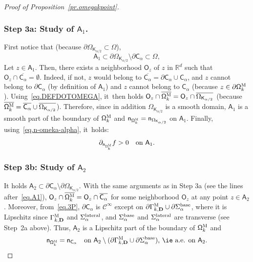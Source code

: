 \documentclass[JEP,XML,SOM,Unicode,NoEqCountersInSection,NoFloatCountersInSection,published]{cedram}
\newcommand{\mbf}[1]{\mathbf{#1}}
\let\pa\partial
\theoremstyle{plain}
\theoremstyle{definition}
\begin{document}
\begin{proof}[Proof of Proposition~\ref{pr.omegakpoint}]
\subsubsection*{Step 3a: Study of $\mathsf A_1$. }
First notice that (because $\partial \Omega_{\mathsf K_{\alpha/2}}\subset \Omega$),
\begin{equation}\label{eq.A1}
\mathsf A_1\subset \partial \Omega_{\mathsf K_{\alpha/2}}\setminus \pa \mathsf C_\alpha \subset \Omega,
\end{equation}
Let $z\in\mathsf A_1$. Then, there exists a neighborhood $\mathsf O_z$ of $z$ in $\mathbb R^d$ such that $\mathsf O_z\cap \overline{\mathsf C_\alpha}=\emptyset$. Indeed, if not, $z$ would belong to $\overline{\mathsf C_\alpha}=\pa \mathsf C_{\alpha}\cup \mathsf C_{\alpha}$, and $z$ cannot belong to $\pa \mathsf C_{\alpha}$ (by definition of $\mathsf A_1$) and $z$ cannot belong to $ \mathsf C_{\alpha}$ (because $z\in \pa \mathsf \Omega_k^{\textsc{M}}$). Using~\eqref{eq.DEFDOTOMEGA}, it~then holds $\mathsf O_z\cap \overline{\mathsf \Omega_k^{\textsc{M}}}= \mathsf O_z \cap \overline{\Omega_{\mathsf K_{\alpha/2}}}$ (because $\overline{\mathsf \Omega_k^{\textsc{M}}}=\overline{\mathsf C_\alpha}\cup \overline{\Omega_{\mathsf K_{\alpha/2}}}$).
Therefore, since in addition $\Omega_{\mathsf K_{\alpha/2}}$ is a smooth domain, $\mathsf A_1$ is a smooth part of the boundary of $ \mathsf \Omega_k^{\textsc{M}}$ and $\mathsf n_{ \mathsf \Omega_k^{\textsc{M}}}=\mathsf n_{ \Omega_{\mathsf K_{\alpha/2}}}$ on $\mathsf A_1$.
Finally, using~\eqref{eq.n-omeka-alpha}, it~holds:
\begin{equation}\label{eq.panf1}
\partial_{ \mathsf n_{ \mathsf \Omega_k^{\textsc{M}}}} f>0 \quad\text{on }\mathsf A_1.
\end{equation}
\subsubsection*{Step 3b: Study of $\mathsf A_2$}
It holds $\mathsf A_2 \subset \pa \mathsf C_\alpha\setminus\partial \Omega_{\mathsf K_{\alpha/2}}$.
With the same arguments as in Step 3a (see the lines
after~\eqref{eq.A1}), $\mathsf O_z\cap \overline{\mathsf
\Omega_k^{\textsc{M}}}= \mathsf O_z \cap \overline{ \mathsf
C_\alpha}$ for some neighborhood $\mathsf O_z$ at any point $z \in \mathsf A_2$.
Moreover, from~\eqref{eq.3P}, $\pa \mathsf C_\alpha$ is
$\mathcal C^\infty$ except on $\pa{\Gamma_{k,\mbf D}^{\textsc{M}}
}\cup \pa \Sigma_\alpha^{\textup{base}}$, where it is Lipschitz since $\Gamma_{k,\mbf D}^{\textsc{M}}
$ and $\Sigma_\alpha^{\textup{lateral}}$, and $\Sigma_\alpha^{\textup{base}}$ and $\Sigma_\alpha^{\textup{lateral}}$ are transverse (see Step~2a above). Thus, $\mathsf A_2$ is a Lipschitz part of the boundary of $ \mathsf \Omega_k^{\textsc{M}}$ and
\begin{equation}\label{eq.nn=A2}
\mathsf n_{ \mathsf \Omega_k^{\textsc{M}}}=\mathsf n_{ \mathsf C_\alpha} \quad \text{on $\mathsf A_2\setminus (\pa{\Gamma_{k,\mbf D}^{\textsc{M}} }\cup \pa \Sigma_\alpha^{\textup{base}})$, \ie a.e. on $\mathsf A_2$}.
\end{equation}


\end{proof}
\end{document}
